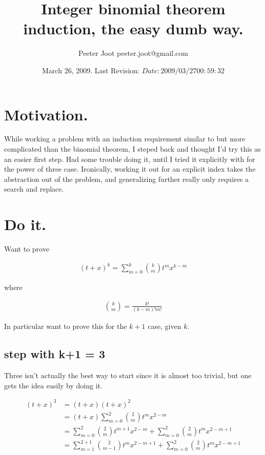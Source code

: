 \documentclass{article}
\title{ Integer binomial theorem induction, the easy dumb way. }
\author{Peeter Joot \quad peeter.joot@gmail.com }
\date{ March 26, 2009.  Last Revision: $Date: 2009/03/27 00:59:32 $ }
\begin{document}
\maketitle{}


\section{ Motivation. }

While working a problem with an induction requirement similar to but more 
complicated than the binomial theorem, I steped back and thought I'd try
this as an easier first step.  Had some trouble doing it, until I tried it
explicitly with for the power of three case.  Ironically, working it
out for an explicit index takes the abstraction out of the problem, and
generalizing further really only requires a search and replace.

\section{ Do it. }

Want to prove

\begin{align}
(t + x)^k = \sum_{m=0}^k \binom{k}{m} t^m x^{k-m}
\end{align}

where

\begin{align}
\binom{k}{m} = \frac{k!}{(k-m)!m!}
\end{align}

In particular want to prove this for the $k+1$ case, given $k$.

\subsection{ step with k+1 = 3 }

Three isn't actually the best way to start since it is almost too trivial, but
one gets the idea easily by doing it.

\begin{align*}
(t + x)^3 
&= (t + x)(t + x)^2  \\
&= (t + x)\sum_{m=0}^2 \binom{2}{m} t^m x^{2-m} \\
&= 
\sum_{m=0}^2 \binom{2}{m} t^{m+1} x^{2-m} 
+ \sum_{m=0}^2 \binom{2}{m} t^{m} x^{2-m + 1} \\
&= 
\sum_{m=1}^{2 + 1} \binom{2}{m-1} t^{m} x^{2 - m + 1} 
+ \sum_{m=0}^2 \binom{2}{m} t^{m} x^{2-m + 1} \\
\end{align*}
\end{document}
